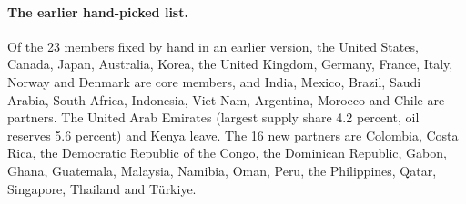 \paragraph{The earlier hand-picked list.} Of the 23 members fixed by hand in an earlier version, the
United States, Canada, Japan, Australia, Korea, the United Kingdom, Germany, France, Italy, Norway and
Denmark are core members, and India, Mexico, Brazil, Saudi Arabia, South Africa, Indonesia, Viet Nam,
Argentina, Morocco and Chile are partners. The United Arab Emirates (largest supply share 4.2
percent, oil reserves 5.6 percent) and Kenya leave. The 16 new partners are Colombia, Costa Rica, the
Democratic Republic of the Congo, the Dominican Republic, Gabon, Ghana, Guatemala, Malaysia, Namibia,
Oman, Peru, the Philippines, Qatar, Singapore, Thailand and T\"urkiye.
